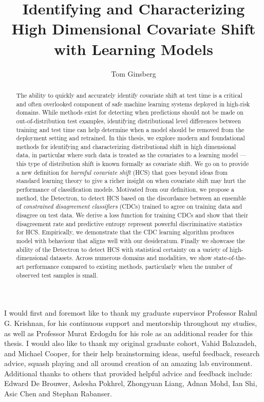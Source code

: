 \documentclass{ut-thesis}
\author{Tom Ginsberg}
\title{Identifying and Characterizing High Dimensional Covariate Shift with Learning Models}
\begin{document}
    \maketitle
    \begin{abstract}
        The ability to quickly and accurately identify covariate shift at test time is a critical and often overlooked component of safe machine learning systems deployed in high-risk domains.
        While methods exist for detecting when predictions should not be made on out-of-distribution test examples, identifying distributional level differences between training and test time can help determine when a model should be removed from the deployment setting and retrained.
        In this thesis, we explore modern and foundational methods for identifying and characterizing distributional shift in high dimensional data, in particular where such data is treated as the covariates to a learning model --- this type of distribution shift is known formally as covariate shift.
        We go on to provide a new definition for \textit{harmful covariate shift} ({\small HCS}) that goes beyond ideas from standard learning theory to give a richer insight on when covariate shift may hurt the performance of classification models.
        Motivated from our definition, we propose a method, the Detectron, to detect {\small HCS} based on the discordance between an ensemble of \textit{constrained disagreement classifiers} (CDCs)  trained to agree on training data and disagree on test data.
        We derive a loss function for training CDCs and show that their disagreement rate and predictive entropy represent powerful discriminative statistics for {\small HCS}.
        Empirically, we demonstrate that the CDC learning algorithm produces model with behaviour that aligns well with our desideratum.
        Finally we showcase the ability of the Detectron to detect {\small HCS} with statistical certainty on a variety of high-dimensional datasets.
        Across numerous domains and modalities, we show state-of-the-art performance compared to existing methods, particularly when the number of observed test samples is small.
    \end{abstract}

    \begin{acknowledgements}
        I would first and foremost like to thank my graduate supervisor Professor Rahul G. Krishnan,
        for his continuous support and mentorship throughout my studies, as well as Professor Murat Erdogdu for
        his role as an additional reader for this thesis.
        I would also like to thank my original graduate cohort, Vahid Balazadeh, and Michael Cooper, for their
        help brainstorming ideas, useful feedback, research advice, squash playing and all
        around creation of an amazing lab environment.
        Additional thanks to others that provided helpful advice and feedback include:
        Edward De Brouwer, Aslesha Pokhrel, Zhongyuan Liang, Adnan Mohd, Ian Shi, Asic Chen and Stephan Rabanser.
    \end{acknowledgements}
    \tableofcontents
    \listoftables
    \listoffigures
\end{document}

